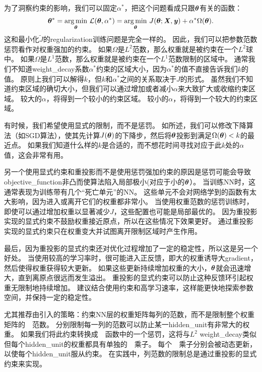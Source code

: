 为了洞察约束的影响，我们可以固定$\alpha^*$，把这个问题看成只跟$\boldsymbol{\theta}$有关的函数：
\begin{align}
 \boldsymbol{\theta}^* =  \underset{\boldsymbol{\theta}}{ \arg\min} ~\mathcal{L}(\boldsymbol{\theta}, \alpha^*) = 
 \underset{\boldsymbol{\theta}}{ \arg\min}~
 J(\boldsymbol{\theta}; \boldsymbol{\mathit{X}}, \boldsymbol{\mathit{y}}) + \alpha^* \Omega(\boldsymbol{\theta}).
\end{align}
这和最小化$\tilde J$的\gls{regularization}训练问题是完全一样的。
因此，我们可以把参数范数惩罚看作对权重强加的约束。
如果$\Omega$是$L^2$范数，那么权重就是被约束在一个$L^2$球中。
如果$\Omega$是$L^1$范数，那么权重就是被约束在一个$L^1$范数限制的区域中。
通常我们不知道\gls{weight_decay}系数$\alpha^*$约束的区域大小，因为$\alpha^*$的值不直接告诉我们$k$的值。
原则上我们可以解得$k$，但$k$和$\alpha^*$之间的关系取决于$J$的形式。
虽然我们不知道约束区域的确切大小，但我们可以通过增加或者减小$\alpha$来大致扩大或收缩约束区域。
较大的$\alpha$，将得到一个较小的约束区域。
较小的$\alpha$，将得到一个较大的约束区域。


有时候，我们希望使用显式的限制，而不是惩罚。
如所述，我们可以修改下降算法（如\gls{SGD}算法），使其先计算$J(\boldsymbol{\theta})$的下降步，然后将$\boldsymbol{\theta}$投影到满足$\Omega(\boldsymbol{\theta}) < k$的最近点。
如果我们知道什么样的$k$是合适的，而不想花时间寻找对应于此$k$处的$\alpha$值，这会非常有用。

另一个使用显式约束和重投影而不是使用惩罚强加约束的原因是惩罚可能会导致\gls{objective_function}非凸而使算法陷入局部极小(对应于小的$\boldsymbol{\theta}$）。
当训练\gls{NN}时，这通常表现为训练带有几个``死亡单元''的\gls{NN}。
这些单元不会对网络学到的函数有太大影响，因为进入或离开它们的权重都非常小。
当使用权重范数的惩罚训练时，即使可以通过增加权重以显著减少$J$，这些配置也可能是局部最优的。
因为重投影实现的显式约束不鼓励权重接近原点，所以在这些情况下效果更好。
通过重投影实现的显式约束只在权重变大并试图离开限制区域时产生作用。

最后，因为重投影的显式约束还对优化过程增加了一定的稳定性，所以这是另一个好处。
当使用较高的学习率时，很可能进入正反馈，即大的权重诱导大\gls{gradient}，然后使得权重获得较大更新。
如果这些更新持续增加权重的大小，$\boldsymbol{\theta}$就会迅速增大，直到离原点很远而发生溢出。
重投影的显式约束可以防止这种反馈环引起权重无限制地持续增加。
\cite{Hinton-et-al-arxiv2012}建议结合使用约束和高学习速率，这样能更快地探索参数空间，并保持一定的稳定性。


\cite{Hinton-et-al-arxiv2012}尤其推荐由\cite{Srebro05}引入的策略：约束\gls{NN}层的权重矩阵每列的范数，而不是限制整个权重矩阵的~~范数。
分别限制每一列的范数可以防止某一\gls{hidden_unit}有非常大的权重。
如果我们将此约束转换成~~函数中的一个惩罚，这将与$L^2$ \gls{weight_decay}类似但每个\gls{hidden_unit}的权重都具有单独的~~乘子。
每个~~乘子分别会被动态更新，以使每个\gls{hidden_unit}服从约束。
在实践中，列范数的限制总是通过重投影的显式约束来实现。

